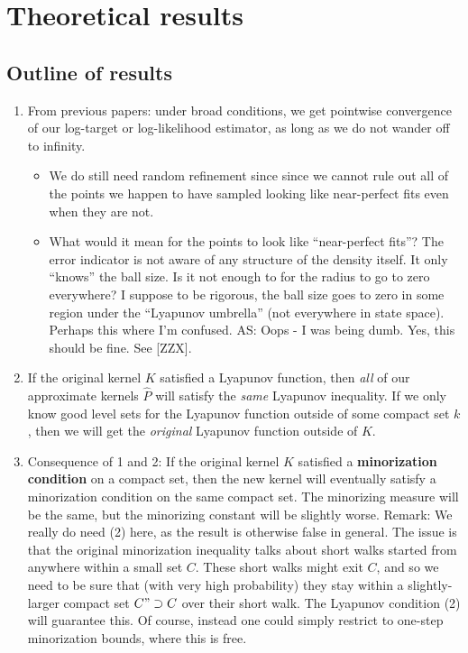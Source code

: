 \section{Theoretical results}

\subsection*{Outline of results}

\begin{enumerate}
  \item From previous papers: under broad conditions, we get pointwise convergence of our log-target or log-likelihood estimator, as long as we do not wander off to infinity.
  \begin{itemize}
    \item We do still need random refinement since \textcolor{red!90!black}{since we cannot rule out all of the points we happen to have sampled looking like near-perfect fits even when they are not.}
    \item[] \textcolor{red!90!black}{What would it mean for the points to look like ``near-perfect fits''?  The error indicator is not aware of any structure of the density itself.  It only ``knows'' the ball size.  Is it not enough to for the radius to go to zero everywhere?  I suppose to be rigorous, the ball size goes to zero in some region under the ``Lyapunov umbrella'' (not everywhere in state space).  Perhaps this where I'm confused.} AS: Oops - I was being dumb. Yes, this should be fine. See [ZZX].
  \end{itemize}
    \item If the original kernel $K$ satisfied a Lyapunov function, then \textit{all} of our approximate kernels $\hat{P}$ will satisfy the \textit{same} Lyapunov inequality.  If we only know good level sets for the Lyapunov function outside of some compact set $k$, then we will get the \textit{original} Lyapunov function outside of $K$.
    \item Consequence of 1 and 2: If the original kernel $K$ satisfied a \textbf{minorization condition} on a compact set, then the new kernel will eventually satisfy a minorization condition on the same compact set. The minorizing measure will be the same, but the minorizing constant will be slightly worse. Remark: We really do need (2) here, as the result is otherwise false in general. The issue is that the original minorization inequality talks about short walks started from anywhere within a small set $C$. These short walks might exit $C$, and so we need to be sure that (with very high probability) they stay within a slightly-larger compact set $C" \supset C$ over their short walk. The Lyapunov condition (2) will guarantee this. Of course, instead one could simply restrict to one-step minorization bounds, where this is free.

\end{enumerate}
